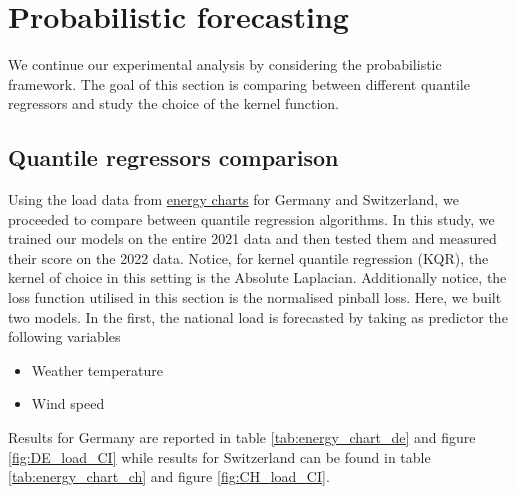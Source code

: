 \section{Probabilistic forecasting}
We continue our experimental analysis by considering the probabilistic framework. The goal of this section is comparing between different quantile regressors and study the choice of the kernel function.

\subsection{Quantile regressors comparison}
Using the load data from \href{https://www.energy-charts.info/index.html?l=en&c=DE}{energy charts} for Germany and Switzerland, we proceeded to compare between quantile regression algorithms. In this study, we trained our models on the entire 2021 data and then tested them and measured their score on the 2022 data.
Notice, for kernel quantile regression (KQR), the kernel of choice in this setting is the Absolute Laplacian. Additionally notice, the loss function utilised in this section is the normalised pinball loss. 
Here, we built two models. In the first, the national load is forecasted by taking as predictor the following variables
\begin{itemize}
    \item Weather temperature
    \item Wind speed
\end{itemize}
Results for Germany are reported in table \ref{tab:energy_chart_de} and figure \ref{fig:DE_load_CI} while results for Switzerland can be found in table \ref{tab:energy_chart_ch} and figure \ref{fig:CH_load_CI}.

